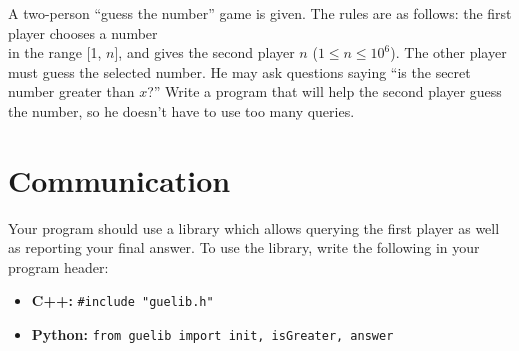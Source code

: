 \documentclass[en]{spiral}
\begin{document}
    \makeheader

    \noindent A two-person ``guess the number'' game is given.
    The rules are as follows:
    the first player chooses a number\\in the range [1, $n$],
    and gives the second player $n$ ($1 \leq n \leq 10^6$).
    The other player must guess the selected number. 
    He may ask questions saying ``is the secret number greater than $x$?''
    Write a program that will help the second player guess the number,
    so he doesn't have to use too many queries.

\section{Communication}

    Your program should use a library which allows querying the first player
    as well as reporting your final answer.
    To use the library, write the following in your program header:
    \begin{itemize}
        \item \textbf{C++:}
            \verb|#include "guelib.h"|

        \item \textbf{Python:}
            \texttt{from guelib import init, isGreater, answer}
    \end{itemize}
\end{document}
